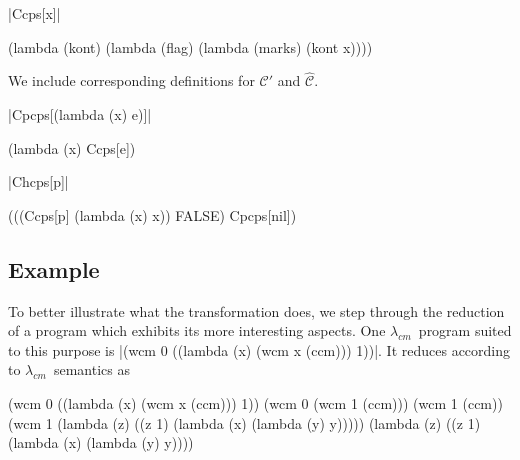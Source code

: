 \documentclass{llncs}
\newcommand{\cm}[0]{$\lambda_{cm}$}
\begin{document}
\begin{schemedefn}{\scheme|Ccps[x]|}
\begin{schemedisplay}
(lambda (kont)
  (lambda (flag)
    (lambda (marks)
      (kont x))))
\end{schemedisplay}
\end{schemedefn}

We include corresponding definitions for $\mathcal{C}'$ and $\hat{\mathcal{C}}$.

\begin{schemedefn}{\scheme|Cpcps[(lambda (x) e)]|}
\begin{schemedisplay}
(lambda (x) Ccps[e])
\end{schemedisplay}
\end{schemedefn}

\begin{schemedefn}{\scheme|Chcps[p]|}
\begin{schemedisplay}
(((Ccps[p] (lambda (x) x)) FALSE) Cpcps[nil])
\end{schemedisplay}
\end{schemedefn}

\subsection{Example}

To better illustrate what the transformation does, we step through the reduction of a program which exhibits its more interesting aspects. One \cm\ program suited to this purpose is \scheme|(wcm 0 ((lambda (x) (wcm x (ccm))) 1))|. It reduces according to \cm\ semantics as
\begin{schemedisplay}
(wcm 0 ((lambda (x) (wcm x (ccm))) 1))
(wcm 0 (wcm 1 (ccm)))
(wcm 1 (ccm))
(wcm 1 (lambda (z) ((z 1) (lambda (x) (lambda (y) y)))))
(lambda (z) ((z 1) (lambda (x) (lambda (y) y))))
\end{schemedisplay}
\end{document}
